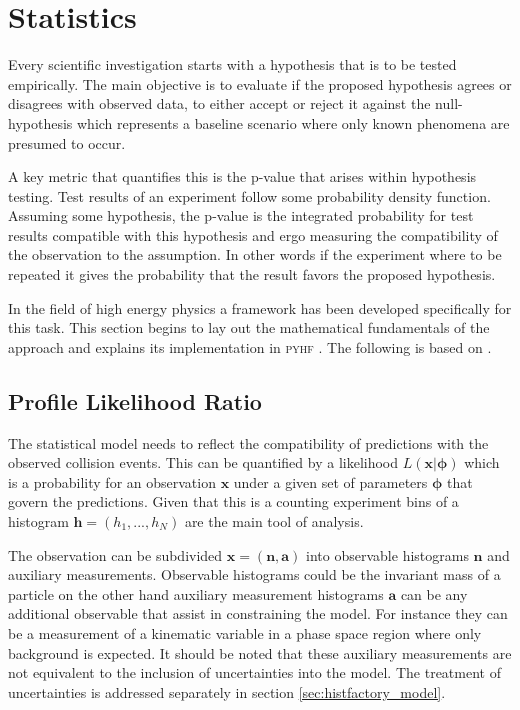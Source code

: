 \chapter{Statistics}\label{sec:statistics}

Every scientific investigation starts with a hypothesis that is to be tested empirically. The main objective is to evaluate if the proposed hypothesis agrees or disagrees with observed data, to either accept or reject it against the null-hypothesis which represents a baseline scenario where only known phenomena are presumed to occur.

A key metric that quantifies this is the p-value that arises within hypothesis testing. Test results of an experiment follow some probability density function. Assuming some hypothesis, the p-value is the integrated probability for test results compatible with this hypothesis and ergo measuring the compatibility of the observation to the assumption. In other words if the experiment where to be repeated it gives the probability that the result favors the proposed hypothesis.

In the field of high energy physics a framework has been developed specifically for this task. This section begins to lay out the mathematical fundamentals of the approach and explains its implementation in \textsc{pyhf} \citep{pyhf,pyhf_joss}. The following is based on \citep{cowan2011asymptotic,behnke2013data,pyhf}.

\section{Profile Likelihood Ratio}\label{sec:likelihood}
The statistical model needs to reflect the compatibility of predictions with the observed collision events. This can be quantified by a likelihood $L(\bm{x} | \bm{\phi})$ which is a probability for an observation $\bm{x}$ under a given set of parameters $\bm{\phi}$ that govern the predictions. Given that this is a counting experiment bins of a histogram $\bm{h}=(h_1,...,h_N)$ are the main tool of analysis.

The observation can be subdivided $\bm{x}=(\bm{n},\bm{a})$ into observable histograms $\bm{n}$ and auxiliary measurements. Observable histograms could be the invariant mass of a particle on the other hand auxiliary measurement histograms $\bm{a}$ can be any additional observable that assist in constraining the model. For instance they can be a measurement of a kinematic variable in a phase space region where only background is expected. It should be noted that these auxiliary measurements are not equivalent to the inclusion of uncertainties into the model. The treatment of uncertainties is addressed separately in section \ref{sec:histfactory_model}.

